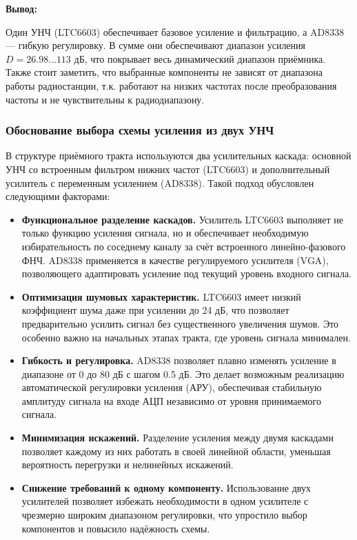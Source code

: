 \documentclass[a4paper,12pt]{article}
\begin{document}
\textbf{Вывод:} 

Один УНЧ (LTC6603) обеспечивает базовое усиление и фильтрацию, а AD8338 — гибкую регулировку. В сумме они обеспечивают диапазон усиления $D = 26.98 \ldots 113$ дБ, что покрывает весь динамический диапазон приёмника.
Также стоит заметить, что выбранные компоненты не зависят от диапазона работы радиостанции, т.к. работают на низких частотах после преобразования частоты и не чувствительны к радиодиапазону.



\subsubsection{Обоснование выбора схемы усиления из двух УНЧ}

В структуре приёмного тракта используются два усилительных каскада: основной УНЧ со встроенным фильтром нижних частот (LTC6603) и дополнительный усилитель с переменным усилением (AD8338). Такой подход обусловлен следующими факторами:

\begin{itemize}
\item \textbf{Функциональное разделение каскадов.} Усилитель LTC6603 выполняет не только функцию усиления сигнала, но и обеспечивает необходимую избирательность по соседнему каналу за счёт встроенного линейно-фазового ФНЧ. AD8338 применяется в качестве регулируемого усилителя (VGA), позволяющего адаптировать усиление под текущий уровень входного сигнала.

\item \textbf{Оптимизация шумовых характеристик.} LTC6603 имеет низкий коэффициент шума даже при усилении до 24 дБ, что позволяет предварительно усилить сигнал без существенного увеличения шумов. Это особенно важно на начальных этапах тракта, где уровень сигнала минимален.

\item \textbf{Гибкость и регулировка.} AD8338 позволяет плавно изменять усиление в диапазоне от 0 до 80 дБ с шагом 0.5 дБ. Это делает возможным реализацию автоматической регулировки усиления (АРУ), обеспечивая стабильную амплитуду сигнала на входе АЦП независимо от уровня принимаемого сигнала.

\item \textbf{Минимизация искажений.} Разделение усиления между двумя каскадами позволяет каждому из них работать в своей линейной области, уменьшая вероятность перегрузки и нелинейных искажений.

\item \textbf{Снижение требований к одному компоненту.} Использование двух усилителей позволяет избежать необходимости в одном усилителе с чрезмерно широким диапазоном регулировки, что упростило выбор компонентов и повысило надёжность схемы.

\end{itemize}
\end{document}
